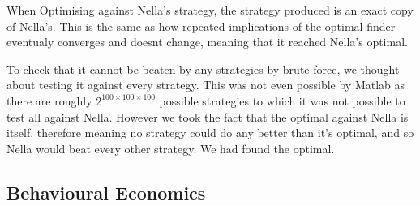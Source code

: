 \documentclass[a4paper,titlepage]{article}
\begin{document}
When Optimising against Nella's strategy, the strategy produced is an exact copy of Nella's. This is the same as how repeated implications of the optimal finder eventualy converges and doesnt change, meaning that it reached Nella's optimal.

To check that it cannot be beaten by any strategies by brute force, we thought about testing it against every strategy. This was not even possible by Matlab as there are roughly $2^{100\times100\times100}$ possible strategies to which it was not possible to test all against Nella. However we took the fact that the optimal against Nella is itself, therefore meaning no strategy could do any better than it's optimal, and so Nella would beat every other strategy. We had found the optimal.

\subsection{Behavioural Economics}
\end{document}
